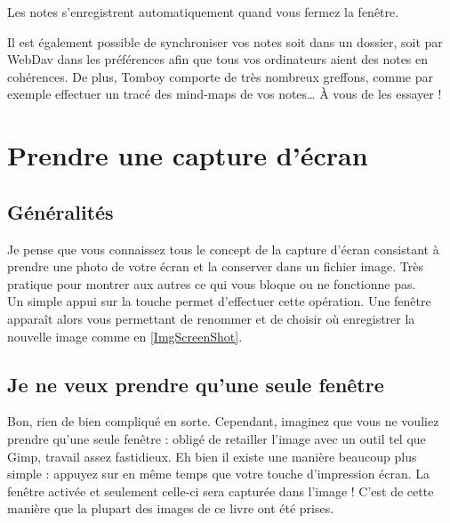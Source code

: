 Les notes s'enregistrent automatiquement quand vous fermez la fenêtre.\par
\begin{nota}
Il est également possible de synchroniser vos notes soit dans un dossier, soit par WebDav dans les préférences afin que tous vos ordinateurs aient des notes en cohérences. De plus, Tomboy comporte de très nombreux greffons, comme par exemple effectuer un tracé des mind-maps de vos notes\ldots{} À vous de les essayer !
\end{nota}
\section{Prendre une capture d'écran}
\subsection{Généralités}
Je pense que vous connaissez tous le concept de la capture d'écran consistant à prendre une photo de votre écran et la conserver dans un fichier image. Très pratique pour montrer aux autres ce qui vous bloque ou ne fonctionne pas.\\
Un simple appui sur la touche  permet d'effectuer cette opération. Une fenêtre apparaît alors vous permettant de renommer et de choisir où enregistrer la nouvelle image comme en \ref{ImgScreenShot}.\par
{}
\subsection{Je ne veux prendre qu'une seule fenêtre}
Bon, rien de bien compliqué en sorte. Cependant, imaginez que vous ne vouliez prendre qu'une seule fenêtre : obligé de retailler l'image avec un outil tel que Gimp, travail assez fastidieux. Eh bien il existe une manière beaucoup plus simple : appuyez sur  en même temps que votre touche d'impression écran. La fenêtre activée et seulement celle-ci sera capturée dans l'image ! C'est de cette manière que la plupart des images de ce livre ont été prises.
